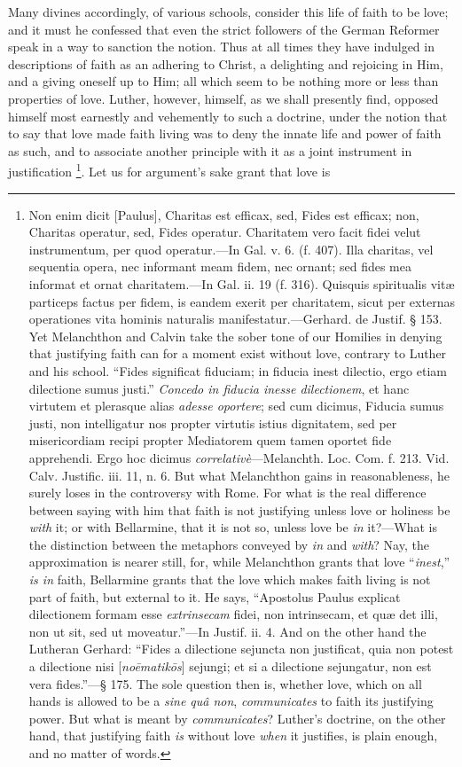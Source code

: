 Many divines accordingly, of various schools, consider this life of
faith to be love; and it must he confessed that even the strict
followers of the German Reformer speak in a way to sanction the
notion. Thus at all times they have indulged in descriptions of faith
as an adhering to Christ, a delighting and rejoicing in Him, and a
giving oneself up to Him; all which seem to be nothing more or less
than properties of love. Luther, however, himself, as we shall
presently find, opposed himself most earnestly and vehemently to such
a doctrine, under the notion that to say that love made faith living
was to deny the innate life and power of faith as such, and to
associate another principle with it as a joint instrument in
justification \footnote{Non enim dicit
[Paulus], Charitas est efficax, sed, Fides est efficax; non, Charitas
operatur, sed, Fides operatur. Charitatem vero facit fidei velut
instrumentum, per quod operatur.—In Gal. v. 6. (f. 407). Illa
charitas, vel sequentia opera, nec informant meam fidem, nec ornant;
sed fides mea informat et ornat charitatem.—In Gal. ii. 19 (f. 316).
Quisquis spiritualis vitæ particeps factus per fidem, is eandem
exerit per charitatem, sicut per externas operationes vita hominis
naturalis manifestatur.—Gerhard. de Justif. § 153. Yet Melanchthon
and Calvin take the sober tone of our Homilies in denying that
justifying faith can for a moment exist without love, contrary to
Luther and his school. ``Fides significat fiduciam; in fiducia
inest dilectio, ergo etiam dilectione sumus justi.'' \emph{Concedo in
fiducia inesse dilectionem}, et hanc virtutem et plerasque alias \emph{adesse
oportere}; sed cum dicimus, Fiducia sumus justi, non intelligatur
nos propter virtutis istius dignitatem, sed per misericordiam recipi
propter Mediatorem quem tamen oportet fide apprehendi. Ergo hoc
dicimus \emph{correlativè}—Melanchth. Loc. Com. f. 213. Vid. Calv.
Justific. iii. 11, n. 6. But what Melanchthon gains in reasonableness,
he surely loses in the controversy with Rome. For what is the real
difference between saying with him that faith is not justifying unless
love or holiness be \emph{with} it; or with Bellarmine, that it is not
so, unless love be \emph{in} it?—What is the distinction between the
metaphors conveyed by \emph{in} and \emph{with}? Nay, the
approximation is nearer still, for, while Melanchthon grants that love
``\emph{inest},'' \emph{is in} faith, Bellarmine grants that
the love which makes faith living is not part of faith, but external
to it. He says, ``Apostolus Paulus explicat dilectionem formam
esse \emph{extrinsecam} fidei, non intrinsecam, et quæ det illi, non
ut sit, sed ut moveatur.''—In Justif. ii. 4. And on the other
hand the Lutheran Gerhard: ``Fides a dilectione sejuncta non
justificat, quia non potest a dilectione nisi [\emph{no\={e}matik\={o}s}]
sejungi; et si a dilectione sejungatur, non est vera fides.''—§
175. The sole question then is, whether love, which on all hands is
allowed to be a \emph{sine quâ non}, \emph{communicates} to faith its
justifying power. But what is meant by \emph{communicates}? Luther's
doctrine, on the other hand, that justifying faith \emph{is} without love
\emph{when} it justifies, is plain enough, and no matter of words.}. Let us for argument's sake grant that love is
